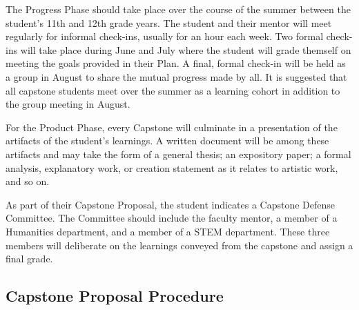 The Progress Phase should take place over the course of the summer between the student’s 11th and 12th grade years.  The student and their mentor will meet regularly for informal check-ins, usually for an hour each week.  Two formal check-ins will take place during June and July where the student will grade themself on meeting the goals provided in their Plan.  A final, formal check-in will be held as a group in August to share the mutual progress made by all.  It is suggested that all capstone students meet over the summer as a learning cohort in addition to the group meeting in August.

For the Product Phase, every Capstone will culminate in a presentation of the artifacts of the student’s learnings.  A written document will be among these artifacts and may take the form of a general thesis; an expository paper; a formal analysis, explanatory work, or creation statement as it relates to artistic work, and so on.  

As part of their Capstone Proposal, the student indicates a Capstone Defense Committee.  The Committee should include the faculty mentor, a member of a Humanities department, and a member of a STEM department.  These three members will deliberate on the learnings conveyed from the capstone and assign a final grade.





























\subsection{Capstone Proposal Procedure}

